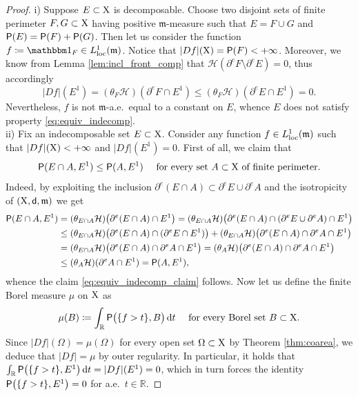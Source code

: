 \documentclass[reqno]{amsart}
\numberwithin{equation}{section}
\newcommand{\R}{\mathbb{R}}
\newcommand{\X}{{\rm X}}
\newcommand{\sfd}{{\sf d}}
\newcommand{\mm}{\mathfrak m}
\renewcommand{\d}{{\mathrm d}}
\newcommand{\1}{\mathbbm 1}
\newcommand{\loc}{{\rm loc}}
\renewcommand{\P}{{\sf P}}
\renewcommand{\H}{{\mathcal H}}
\begin{document}
\begin{proof}
{\color{blue}i)} Suppose \(E\subset\X\) is decomposable. Choose
two disjoint sets of finite perimeter \(F,G\subset\X\) having positive
\(\mm\)-measure such that \(E=F\cup G\) and \(\P(E)=\P(F)+\P(G)\).
Then let us consider the function \(f\coloneqq\1_F\in L^1_\loc(\mm)\).
Notice that \(|Df|(\X)=\P(F)<+\infty\). Moreover, we know from
Lemma \ref{lem:incl_front_comp} that \(\H(\partial^e F\setminus\partial^e E)=0\),
thus accordingly
\[
|Df|(E^1)=(\theta_F\H)(\partial^e F\cap E^1)
\leq(\theta_F\H)(\partial^e E\cap E^1)=0.
\]
Nevertheless, \(f\) is not \(\mm\)-a.e.\ equal to a constant on \(E\),
whence \(E\) does not satisfy property \eqref{eq:equiv_indecomp}.\\
{\color{blue}ii)} Fix an indecomposable set \(E\subset\X\). Consider any function
\(f\in L^1_\loc(\mm)\) such that \(|Df|(\X)<+\infty\) and \(|Df|(E^1)=0\).
First of all, we claim that
\begin{equation}\label{eq:equiv_indecomp_claim}
\P(E\cap A,E^1)\leq\P(A,E^1)\quad
\text{ for every set }A\subset\X\text{ of finite perimeter.}
\end{equation}
Indeed, by exploiting the inclusion
\(\partial^e(E\cap A)\subset\partial^e E\cup\partial^e A\)
and the isotropicity of \((\X,\sfd,\mm)\) we get
\[\begin{split}
\P(E\cap A,E^1)&=(\theta_{E\cap A}\H)\big(\partial^e(E\cap A)\cap E^1\big)
=(\theta_{E\cap A}\H)\big(\partial^e(E\cap A)\cap
(\partial^e E\cup\partial^e A)\cap E^1\big)\\
&\leq(\theta_{E\cap A}\H)\big(\partial^e(E\cap A)\cap(\partial^e E\cap E^1)\big)+
(\theta_{E\cap A}\H)\big(\partial^e(E\cap A)\cap\partial^e A\cap E^1\big)\\
&=(\theta_{E\cap A}\H)\big(\partial^e(E\cap A)\cap\partial^e A\cap E^1\big)
=(\theta_A\H)\big(\partial^e(E\cap A)\cap\partial^e A\cap E^1\big)\\
&\leq(\theta_A\H)(\partial^e A\cap E^1)=\P(A,E^1),
\end{split}\]
whence the claim \eqref{eq:equiv_indecomp_claim} follows.
Now let us define the finite Borel measure \(\mu\) on \(\X\) as
\[
\mu(B)\coloneqq\int_\R\P\big(\{f>t\},B\big)\,\d t
\quad\text{ for every Borel set }B\subset\X.
\]
Since \(|Df|(\Omega)=\mu(\Omega)\) for every open set \(\Omega\subset\X\)
by Theorem \ref{thm:coarea}, we deduce that \(|Df|=\mu\) by outer regularity.
In particular, it holds that \(\int_\R\P\big(\{f>t\},E^1\big)\,\d t=|Df|(E^1)=0\),
which in turn forces the identity \(\P\big(\{f>t\},E^1\big)=0\) for a.e.\ \(t\in\R\).

\end{proof}
\end{document}

